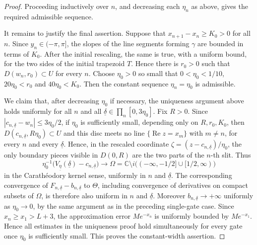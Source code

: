 \documentclass[10pt,a4paper]{amsart}
\newcommand{\C}{{\mathbb{C}}}
\newcommand{\Rea}{\operatorname{Re }}
\newcommand{\uldelta}{\underline{\delta}}
\newcommand{\uleta}{\underline{\eta}}
\begin{document}
\begin{proof}
	Proceeding inductively over \(n\), and decreasing each \(\eta_n\) as above,
	gives the required admissible sequence.
	
	It remains to justify the final assertion. Suppose that \(x_{n+1}-x_n\ge K_0>0\) for all \(n\). Since \(y_n\in(-\pi,\pi]\), the slopes of the line segments forming \(\gamma\) are bounded in terms of \(K_0\). After the initial rescaling, the same is true, with a uniform bound, for the two sides of the initial trapezoid \(T\). Hence there is \(r_0>0\) such that \(D(w_n,r_0)\subset U\) for every \(n\). Choose \(\eta_0>0\) so small that $0<\eta_0<1/10$, \(20\eta_0<r_0\) and \(40\eta_0<K_0\). Then the constant sequence \(\eta_n=\eta_0\) is admissible.
	
	We claim that, after decreasing \(\eta_0\) if necessary, the uniqueness
	argument above holds uniformly for all \(n\) and all
	\(\uldelta\in\prod_n[0,3\eta_0]\). Fix \(R>0\). Since
	\(|c_{n,\uldelta}-w_n|\le3\eta_0/2\), if \(\eta_0\) is sufficiently small,
	depending only on \(R,r_0,K_0\), then
	\(D(c_{n,\uldelta},R\eta_0)\subset U\) and this disc meets no line
	\(\{\Rea z=x_m\}\) with \(m\ne n\), for every \(n\) and every
	\(\uldelta\). Hence, in the rescaled coordinate
	\(\zeta=(z-c_{n,\uldelta})/\eta_0\), the only boundary pieces visible in
	\(D(0,R)\) are the two parts of the \(n\)-th slit. Thus
	\[
	\eta_0^{-1}\bigl(V_{\uleta}(\uldelta)-c_{n,\uldelta}\bigr)
	\longrightarrow
	\Omega=\C\setminus i\bigl((-\infty,-1/2]\cup[1/2,\infty)\bigr)
	\]
	in the Carath\'eodory kernel sense, uniformly in \(n\) and
	\(\uldelta\). The corresponding convergence of
	\(F_{n,\uldelta}-b_{n,\uldelta}\) to \(\Theta\), including convergence of
	derivatives on compact subsets of \(\Omega\), is therefore also uniform in
	\(n\) and \(\uldelta\). Moreover \(b_{n,\uldelta}\to+\infty\) uniformly as
	\(\eta_0\to0\), by the same argument as in the preceding single-gate case. Since \(x_n\ge x_1>L+3\), the approximation error
	\(Me^{-x_n}\) is uniformly bounded by \(Me^{-x_1}\). Hence all estimates in
	the uniqueness proof hold simultaneously for every gate once \(\eta_0\) is
	sufficiently small. This proves the constant-width assertion.
\end{proof}
\end{document}
